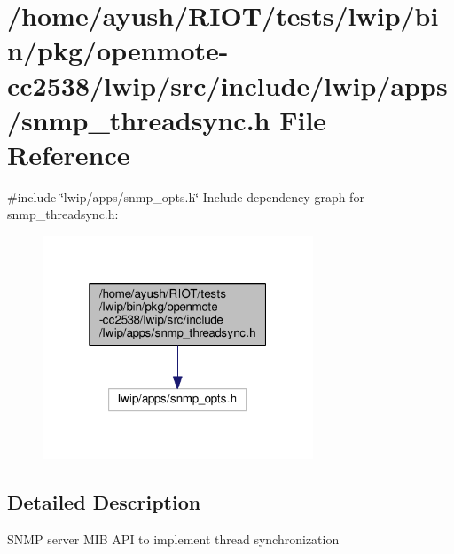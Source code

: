 \hypertarget{openmote-cc2538_2lwip_2src_2include_2lwip_2apps_2snmp__threadsync_8h}{}\section{/home/ayush/\+R\+I\+O\+T/tests/lwip/bin/pkg/openmote-\/cc2538/lwip/src/include/lwip/apps/snmp\+\_\+threadsync.h File Reference}
\label{openmote-cc2538_2lwip_2src_2include_2lwip_2apps_2snmp__threadsync_8h}
{\ttfamily \#include \char`\"{}lwip/apps/snmp\+\_\+opts.\+h\char`\"{}}\newline
Include dependency graph for snmp\+\_\+threadsync.\+h\+:
\nopagebreak
\begin{figure}[H]
\begin{center}
\leavevmode
\includegraphics[width=229pt]{openmote-cc2538_2lwip_2src_2include_2lwip_2apps_2snmp__threadsync_8h__incl}
\end{center}
\end{figure}


\subsection{Detailed Description}
S\+N\+MP server M\+IB A\+PI to implement thread synchronization 